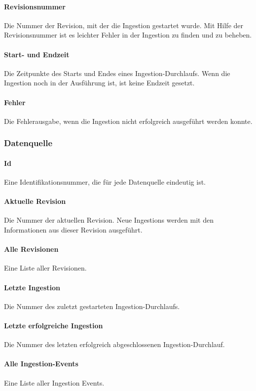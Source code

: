 \paragraph{Revisionsnummer}
Die Nummer der Revision, mit der die Ingestion gestartet wurde.
Mit Hilfe der Revisionsnummer ist es leichter Fehler in der Ingestion zu finden und zu beheben. 

\paragraph{Start- und Endzeit}
Die Zeitpunkte des Starts und Endes eines Ingestion-Durchlaufs.
Wenn die Ingestion noch in der Ausführung ist, ist keine Endzeit gesetzt. 

\paragraph{Fehler}
Die Fehlerausgabe, wenn die Ingestion nicht erfolgreich ausgeführt werden konnte. 
    
\subsubsection*{Datenquelle} 
    
\paragraph{Id} 
Eine Identifikationsnummer, die für jede Datenquelle eindeutig ist. 

\paragraph{Aktuelle Revision}
Die Nummer der aktuellen Revision.
Neue Ingestions werden mit den Informationen aus dieser Revision ausgeführt. 

\paragraph{Alle Revisionen}
Eine Liste aller Revisionen. 

\paragraph{Letzte Ingestion}
Die Nummer des zuletzt gestarteten Ingestion-Durchlaufs. 

\paragraph{Letzte erfolgreiche Ingestion}
Die Nummer des letzten erfolgreich abgeschlossenen Ingestion-Durchlauf. 

\paragraph{Alle Ingestion-Events}
Eine Liste aller Ingestion Events.

